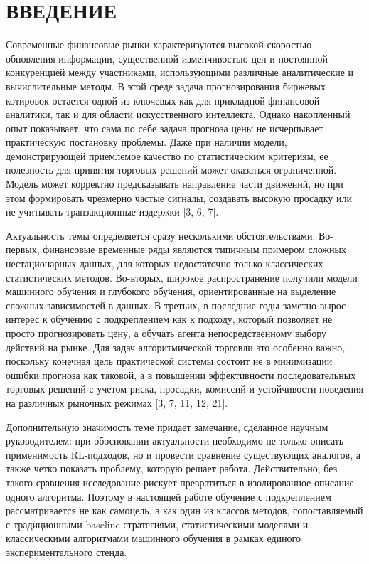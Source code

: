 \clearpage
\section*{ВВЕДЕНИЕ}

Современные финансовые рынки характеризуются высокой скоростью обновления информации, существенной изменчивостью цен и постоянной конкуренцией между участниками, использующими различные аналитические и вычислительные методы. В этой среде задача прогнозирования биржевых котировок остается одной из ключевых как для прикладной финансовой аналитики, так и для области искусственного интеллекта. Однако накопленный опыт показывает, что сама по себе задача прогноза цены не исчерпывает практическую постановку проблемы. Даже при наличии модели, демонстрирующей приемлемое качество по статистическим критериям, ее полезность для принятия торговых решений может оказаться ограниченной. Модель может корректно предсказывать направление части движений, но при этом формировать чрезмерно частые сигналы, создавать высокую просадку или не учитывать транзакционные издержки [3, 6, 7].

Актуальность темы определяется сразу несколькими обстоятельствами. Во-первых, финансовые временные ряды являются типичным примером сложных нестационарных данных, для которых недостаточно только классических статистических методов. Во-вторых, широкое распространение получили модели машинного обучения и глубокого обучения, ориентированные на выделение сложных зависимостей в данных. В-третьих, в последние годы заметно вырос интерес к обучению с подкреплением как к подходу, который позволяет не просто прогнозировать цену, а обучать агента непосредственному выбору действий на рынке. Для задач алгоритмической торговли это особенно важно, поскольку конечная цель практической системы состоит не в минимизации ошибки прогноза как таковой, а в повышении эффективности последовательных торговых решений с учетом риска, просадки, комиссий и устойчивости поведения на различных рыночных режимах [3, 7, 11, 12, 21].

Дополнительную значимость теме придает замечание, сделанное научным руководителем: при обосновании актуальности необходимо не только описать применимость RL-подходов, но и провести сравнение существующих аналогов, а также четко показать проблему, которую решает работа. Действительно, без такого сравнения исследование рискует превратиться в изолированное описание одного алгоритма. Поэтому в настоящей работе обучение с подкреплением рассматривается не как самоцель, а как один из классов методов, сопоставляемый с традиционными baseline-стратегиями, статистическими моделями и классическими алгоритмами машинного обучения в рамках единого экспериментального стенда.

